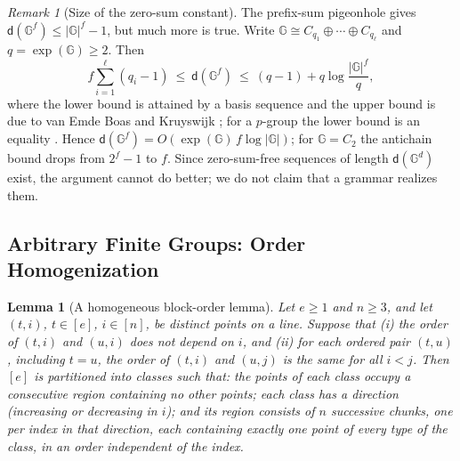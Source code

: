 \documentclass[11pt]{article}
\numberwithin{equation}{section}
\theoremstyle{plain}
\newtheorem{lemma}[theorem]{Lemma}
\theoremstyle{definition}
\theoremstyle{remark}
\newtheorem{remark}[theorem]{Remark}
\begin{document}
\begin{remark}[Size of the zero-sum constant]
\label{rem:davenport-size}
The prefix-sum pigeonhole gives $\mathsf d({\mathbb G}^f)\le|{\mathbb G}|^f-1$, but much more is true.
Write ${\mathbb G}\cong C_{q_1}\oplus\cdots\oplus C_{q_\ell}$ and $q=\exp({\mathbb G})\ge2$.  Then
\[
 f\sum_{i=1}^{\ell}(q_i-1)\ \le\ \mathsf d({\mathbb G}^f)\ \le\ (q-1)+q\log\frac{|{\mathbb G}|^f}{q},
\]
where the lower bound is attained by a basis sequence and the upper bound is due to
van Emde Boas and Kruyswijk \cite[Proposition~5.1.8 and
Theorem~5.5.5]{GeroldingerHalterKoch2006}; for a $p$-group the lower bound is an
equality \cite[Theorem~5.5.9]{GeroldingerHalterKoch2006}.  Hence
$\mathsf d({\mathbb G}^f)=O(\exp({\mathbb G})\,f\log|{\mathbb G}|)$; for ${\mathbb G}=C_2$ the antichain bound drops from
$2^f-1$ to $f$.  Since zero-sum-free sequences of length $\mathsf d({\mathbb G}^d)$ exist, the
argument cannot do better; we do not claim that a grammar realizes them.
\end{remark}

\subsection{Arbitrary Finite Groups: Order Homogenization}
\label{app:window-group}

\begin{lemma}[A homogeneous block-order lemma]
\label{lem:group-block-order}
Let $e\ge1$ and $n\ge3$, and let $(t,i)$, $t\in[e]$, $i\in[n]$, be distinct
points on a line.  Suppose that \textup{(i)} the order of $(t,i)$ and $(u,i)$ does
not depend on $i$, and \textup{(ii)} for each ordered pair $(t,u)$, including
$t=u$, the order of $(t,i)$ and $(u,j)$ is the same for all $i<j$.  Then $[e]$ is
partitioned into classes such that: the points of each class occupy a
consecutive region containing no other points; each class has a direction
(increasing or decreasing in $i$); and its region consists of $n$ successive
\emph{chunks}, one per index in that direction, each containing exactly one point
of every type of the class, in an order independent of the index.
\end{lemma}
\end{document}
